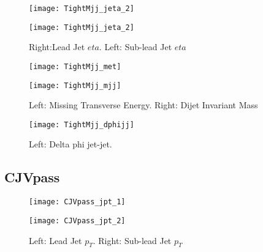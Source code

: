\documentclass[a4paper,10pt]{article}
\begin{document}
\begin{figure}[!h]
\centering
\begin{minipage}[!h]{0.4\linewidth}
\centering
\texttt{[image: TightMjj\_jeta\_2]}
\end{minipage}%
\begin{minipage}[!h]{0.4\linewidth}
\centering
\texttt{[image: TightMjj\_jeta\_2]}
\end{minipage}
\caption{Right:Lead Jet $eta$. Left: Sub-lead Jet $eta$}
\end{figure}

\begin{figure}[!h]
\centering
\begin{minipage}[!h]{0.4\linewidth}
\centering
\texttt{[image: TightMjj\_met]}
\end{minipage}%
\begin{minipage}[!h]{0.4\linewidth}
\centering
\texttt{[image: TightMjj\_mjj]}
\end{minipage}
\caption{Left: Missing Transverse Energy. Right: Dijet Invariant Mass}
\end{figure}

\begin{figure}[!h]
\centering
\begin{minipage}[!h]{0.4\linewidth}
\centering
\texttt{[image: TightMjj\_dphijj]}
\end{minipage}%
\begin{minipage}[!h]{0.4\linewidth}
\centering
\end{minipage}
\caption{Left: Delta phi jet-jet.}
\end{figure}

\clearpage
\subsection{CJVpass}
  
\begin{figure}[!h]
\centering
\begin{minipage}[!h]{0.4\linewidth}
\centering
\texttt{[image: CJVpass\_jpt\_1]}
\end{minipage}%
\begin{minipage}[!h]{0.4\linewidth}
  \texttt{[image: CJVpass\_jpt\_2]}
\end{minipage}
\caption{Left: Lead Jet $p_T$. Right: Sub-lead Jet $p_T$}
\end{figure}
\end{document}
